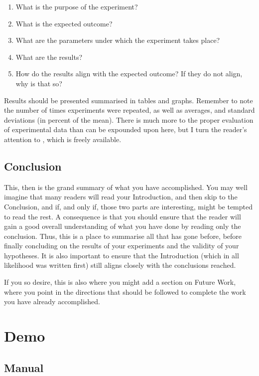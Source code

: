 \documentclass[ twoside,openright,titlepage,numbers=noenddot,headinclude,%
                footinclude=true,cleardoublepage=empty,abstractoff, %
                BCOR=5mm,paper=a4,fontsize=11pt,%
                ngerman,american,%
                ]{scrreprt}
\begin{document}
\begin{enumerate}
\item What is the purpose of the experiment?
\item What is the expected outcome?
\item What are the parameters under which the experiment takes place?
\item What are the results?
\item How do the results align with the expected outcome? If they do
  not align, why is that so?
\end{enumerate}

Results should be presented summarised in tables and graphs.  Remember
to note the number of times experiments were repeated, as well as
averages, and standard deviations (in percent of the mean).  There is
much more to the proper evaluation of experimental data than can be
expounded upon here, but I turn the reader's attention to
\citep{Downey2011:TSPASFP2011}, which is freely available.


\chapter{Conclusion}
\label{cha:conclusion}

This, then is the grand summary of what you have accomplished.  You
may well imagine that many readers will read your Introduction, and
then skip to the Conclusion, and if, and only if, those two parts are
interesting, might be tempted to read the rest. A consequence is that
you should ensure that the reader will gain a good overall
understanding of what you have done by reading only the conclusion.
Thus, this is a place to summarise all that has gone before, before
finally concluding on the results of your experiments and the validity
of your hypotheses. It is also important to ensure that the
Introduction (which in all likelihood was written first) still aligns
closely with the conclusions reached.

If you so desire, this is also where you might add a section on Future
Work, where you point in the directions that should be followed to
complete the work you have already accomplished.



\part{Demo}
\label{part:manual}
\chapter{Manual}

\cleardoublepage
\end{document}
